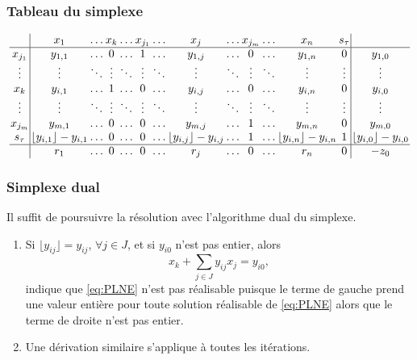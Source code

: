 \documentclass[usepdftitle=false]{beamer}
\begin{document}
\begin{frame}
\frametitle{Tableau du simplexe}

\begin{footnotesize}
	$$
\arraycolsep=1pt
	\begin{array}{c|cccccccccccc|c}
		& x_1 & \ldots & x_k & \ldots & x_{j_1}& \ldots & x_j & \ldots & x_{j_m} & \ldots & x_n & s_{\tau} \\
		\hline
		x_{j_1}& y_{1,1} & \ldots & 0 & \ldots & 1 & \ldots & y_{1,j} & \ldots & 0 & \ldots & y_{1,n} & 0 & y_{1,0} \\
		\vdots & \vdots & \ddots & \vdots & \ddots & \vdots & \ddots & \vdots & \ddots & \vdots & \ddots & \vdots & \vdots & \vdots \\
		x_k & y_{i,1} & \ldots & 1 & \ldots & 0 & \ldots & y_{i,j} & \ldots & 0 & \ldots & y_{i,n} & 0 & y_{i,0} \\
		\vdots & \vdots & \ddots & \vdots & \ddots & \vdots & \ddots & \vdots & \ddots & \vdots & \ddots & \vdots & \vdots & \vdots \\
		x_{j_m} & y_{m,1} & \ldots & 0 & \ldots & 0 & \ldots & y_{m,j} & \ldots & 1 & \ldots & y_{m,n} & 0 & y_{m,0} \\
		s_{\tau} & \lfloor y_{i,1} \rfloor - y_{i,1} & \ldots & 0 & \ldots & 0 & \ldots & \lfloor y_{i,j} \rfloor - y_{i,j} & \ldots & 1 & \ldots & \lfloor y_{i,n} \rfloor - y_{i,n} & 1 & \lfloor y_{i,0} \rfloor - y_{i,0} \\
		\hline
		& r_1 & \ldots & 0 & \ldots & 0 & \ldots & r_j & \ldots & 0 & \ldots & r_n & 0 & -z_0
	\end{array}
	$$
\end{footnotesize}

\end{frame}

\begin{frame}
\frametitle{Simplexe dual}

Il suffit de poursuivre la résolution avec l'algorithme dual du simplexe.

\mbox{}

\begin{enumerate}
	\item
	Si $\lfloor y_{ij} \rfloor = y_{ij}$, $\forall j \in J$, et si $y_{i0}$ n'est pas entier, alors
    $$
	x_k + \sum_{j \in J} y_{ij} x_j = y_{i0},
	$$
	indique que \eqref{eq:PLNE} n'est pas réalisable puisque le terme de gauche prend une
	valeur entière pour toute solution réalisable de \eqref{eq:PLNE} alors que le terme de
	droite n'est pas entier.
	\item
	Une dérivation similaire s'applique à toutes les itérations.
\end{enumerate}

\end{frame}
\end{document}

